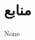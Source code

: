 \documentclass{article}
\begin{document}
\section*{منابع}
\renewcommand{\section}[2]{}%
\begin{thebibliography}{99} %


\begin{LTRitems}

\resetlatinfont

 None
\end{LTRitems}

\end{thebibliography}
\end{document}
